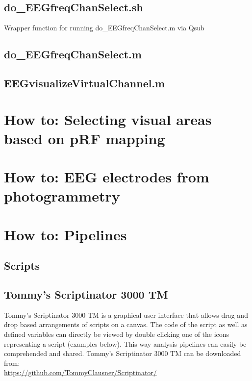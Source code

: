 \documentclass[12pt,a4paper]{scrartcl}
\begin{document}
\subsection{do\_EEGfreqChanSelect.sh}
\label{sec:selchan}
Wrapper function for running do\_EEGfreqChanSelect.m via Qsub

\subsection{do\_EEGfreqChanSelect.m}

\subsection{EEGvisualizeVirtualChannel.m}

\section{How to: Selecting visual areas based on pRF mapping}
\label{sec:GUIprf}

\section{How to: EEG electrodes from photogrammetry}
\label{sec:janus3D}

\section{How to: Pipelines}
\label{sec:pipelines}
\subsection{Scripts}
\subsection{Tommy's Scriptinator 3000 TM}
\label{sec:scriptinator}
Tommy's Scriptinator 3000 TM is a graphical user interface that allows drag and drop based arrangements of scripts on a canvas. The code of the script as well as defined variables can directly be viewed by double clicking one of the icons representing a script (examples below). This way analysis pipelines can easily be comprehended and shared. Tommy's Scriptinator 3000 TM can be downloaded from:\\

\href{https://github.com/TommyClausner/Scriptinator/}{https://github.com/TommyClausner/Scriptinator/}\\
\end{document}
